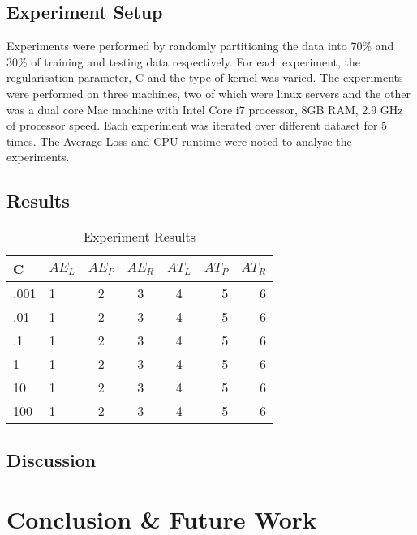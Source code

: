 \documentclass[letterpaper]{article}
\begin{document}
\subsection{Experiment Setup}
Experiments were performed by randomly partitioning the data into 70\% and 30\% of training and testing data respectively. For each experiment, the regularisation parameter, C and the type of kernel was varied. The experiments were performed on three machines, two of which were linux servers and the other was a dual core Mac machine with Intel Core i7 processor, 8GB RAM, 2.9 GHz of processor speed. Each experiment was iterated over different dataset for 5 times. The Average Loss and CPU runtime were noted to analyse the experiments.

\subsection{Results}

\begin{table}[htdp]
\begin{center}
\begin{tabular}{l | l | c | c | c | r | r |}
C & $AE_{L}$ & $AE_{P}$ & $AE_{R}$ & $AT_{L}$ & $AT_{P}$ & $AT_{R}$ \\
\hline
.001 & 1 & 2 & 3 & 4 & 5 & 6 \\
\hline
.01 & 1 & 2 & 3 & 4 & 5 & 6 \\
\hline
.1 & 1 & 2 & 3 & 4 & 5 & 6 \\
\hline
1 & 1 & 2 & 3 & 4 & 5 & 6 \\
\hline
10 & 1 & 2 & 3 & 4 & 5 & 6 \\
\hline
100 & 1 & 2 & 3 & 4 & 5 & 6 \\
\end{tabular}
\end{center}
\caption{Experiment Results}
\label{table: results}
\end{table}

\subsection{Discussion}



\section{Conclusion \& Future Work}




\end{document}
